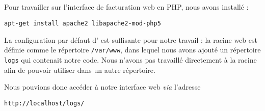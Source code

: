 \subsection{\apa}

Pour travailler sur l’interface de facturation web en PHP, nous avons installé {\apa} :

\begin{verbatim}
apt-get install apache2 libapache2-mod-php5
\end{verbatim}

La configuration par défaut d’{\apa} est suffisante pour notre travail : la racine web est définie comme le répertoire \texttt{/var/www}, dans lequel nous avons ajouté un répertoire \texttt{logs} qui contenait notre code. Nous n’avons pas travaillé directement à la racine afin de pouvoir utiliser {\pma} dans un autre répertoire.

Nous pouvions donc accéder à notre interface web \textit{via} l’adresse
\begin{verbatim}
http://localhost/logs/
\end{verbatim}
